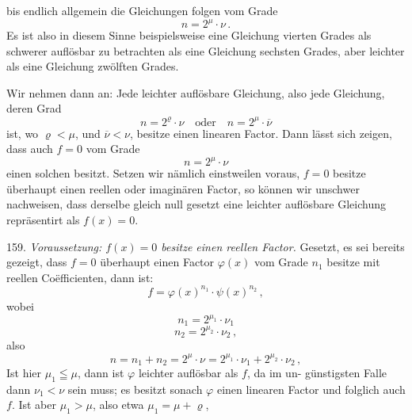 bis endlich allgemein die Gleichungen folgen vom Grade
\[ n = 2^{\mu}\cdot \nu\, . \]
Es ist also in diesem Sinne beispielsweise eine Gleichung vierten
Grades als schwerer auflösbar zu betrachten als eine Gleichung sechsten
Grades, aber leichter als eine Gleichung zwölften Grades.

Wir nehmen dann an: Jede leichter auflösbare Gleichung, also
jede Gleichung, deren Grad
\[ n = 2^{\varrho}\cdot \nu \quad \text{oder} \quad n = 2^{\mu}\cdot \overline{\nu} \]
ist, wo $\varrho<\mu$, und $\overline{\nu}<\nu$, besitze einen linearen Factor. Dann lässt sich
zeigen, dass auch $f=0$ vom Grade
\[ n = 2^{\mu}\cdot \nu \]
einen solchen besitzt. Setzen wir nämlich einstweilen voraus, $f=0$
besitze überhaupt einen reellen oder imaginären Factor, so können
wir unschwer nachweisen, dass derselbe gleich null gesetzt eine leichter
auflösbare Gleichung repräsentirt als $f(x)=0$.

159. \emph{Voraussetzung: $f(x)=0$ besitze einen reellen Factor.} Gesetzt,
es sei bereits gezeigt, dass $f=0$ überhaupt einen Factor $\varphi(x)$ vom
Grade $n_1$ besitze mit reellen Co\"efficienten, dann ist:
\[ f = \varphi(x)^{n_1}\cdot \psi(x)^{n_2}\, , \]
wobei
\[ n_1 = 2^{\mu_1}\cdot \nu_1 \]
\[ n_2 = 2^{\mu_2}\cdot \nu_2\, , \]
also
\[ n = n_1+n_2 = 2^{\mu}\cdot \nu = 2^{\mu_1}\cdot \nu_1 + 2^{\mu_2}\cdot \nu_2\, , \]
Ist hier $\mu_1\leqq \mu$, dann ist $\varphi$ leichter auflösbar als $f$, da im un-
günstigsten Falle dann $\nu_1<\nu$ sein muss; es besitzt sonach $\varphi$ einen
linearen Factor und folglich auch $f$. Ist aber $\mu_1>\mu$, also etwa $\mu_1=\mu+\varrho$,


